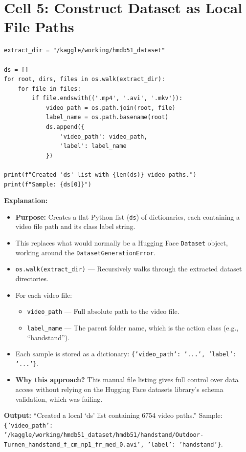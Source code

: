 \documentclass[a4paper, 12pt]{article}
\newenvironment{explanation}{%
  \par\smallskip
  \noindent\textcolor{blue!70!black}{\textbf{Explanation:}}\\
  \noindent
}{\par\medskip}
\begin{document}
\newpage
\section{Cell 5: Construct Dataset as Local File Paths}

\begin{lstlisting}
extract_dir = "/kaggle/working/hmdb51_dataset"

ds = []
for root, dirs, files in os.walk(extract_dir):
    for file in files:
        if file.endswith(('.mp4', '.avi', '.mkv')):
            video_path = os.path.join(root, file)
            label_name = os.path.basename(root)
            ds.append({
                'video_path': video_path,
                'label': label_name
            })

print(f"Created 'ds' list with {len(ds)} video paths.")
print(f"Sample: {ds[0]}")
\end{lstlisting}

\begin{explanation}
\begin{itemize}[nosep]
  \item \textbf{Purpose:} Creates a flat Python list (\texttt{ds}) of dictionaries, each containing a video file path and its class label string.
  \item This replaces what would normally be a Hugging Face \texttt{Dataset} object, working around the \texttt{DatasetGenerationError}.
  \item \texttt{os.walk(extract\_dir)} --- Recursively walks through the extracted dataset directories.
  \item For each video file:
  \begin{itemize}[nosep]
    \item \texttt{video\_path} --- Full absolute path to the video file.
    \item \texttt{label\_name} --- The parent folder name, which is the action class (e.g., ``handstand'').
  \end{itemize}
  \item Each sample is stored as a dictionary: \texttt{\{'video\_path': '...', 'label': '...'\}}.
  \item \textbf{Why this approach?} This manual file listing gives full control over data access without relying on the Hugging Face datasets library's schema validation, which was failing.
\end{itemize}
\textbf{Output:} ``Created a local `ds' list containing 6754 video paths.'' Sample: \texttt{\{'video\_path': '/kaggle/working/hmdb51\_dataset/hmdb51/handstand/Outdoor-Turnen\_handstand\_f\_cm\_np1\_fr\_med\_0.avi', 'label': 'handstand'\}}.
\end{explanation}
\end{document}
